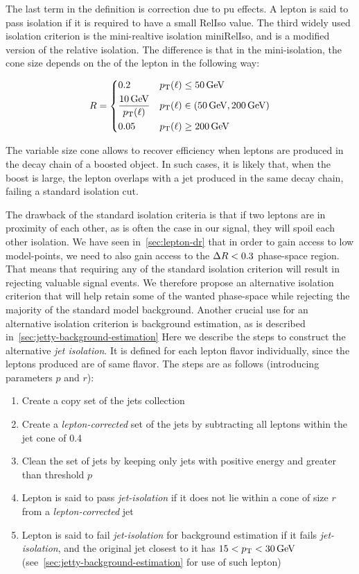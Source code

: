 The last term in the definition is correction due to \gls{pu} effects. A lepton is said to pass isolation if it is required to have a small RelIso value. The third widely used isolation criterion is the mini-realtive isolation miniRelIso, and is a modified version of the relative isolation. The difference is that in the mini-isolation, the cone size depends on the \pt of the lepton in the following way:

\begin{equation}
R = 
\begin{dcases}
0.2 & p_{\mathrm{T}}(\ell)\leq 50\,\text{Ge\hspace{-.08em}V} \\
\frac{10\,\text{Ge\hspace{-.08em}V}}{p_{\mathrm{T}}(\ell)} & p_{\mathrm{T}}(\ell) \in (50\,\text{Ge\hspace{-.08em}V} , 200\,\text{Ge\hspace{-.08em}V}) \\
0.05 & p_{\mathrm{T}}(\ell)\geq 200\,\text{Ge\hspace{-.08em}V}
\end{dcases}
\end{equation}

The variable size cone allows to recover efficiency when leptons are produced in the decay chain of a boosted object. In such cases, it is likely that, when the boost is large, the lepton overlaps with a jet produced in the same decay chain, failing a standard isolation cut. 

The drawback of the standard isolation criteria is that if two leptons are in proximity of each other, as is often the case in our signal, they will spoil each other isolation. We have seen in~\ref{sec:lepton-dr} that in order to gain access to low \dm model-points, we need to also gain access to the $\Delta R<0.3$ phase-space region. That means that requiring any of the standard isolation criterion will result in rejecting valuable signal events. We therefore propose an alternative isolation criterion that will help retain some of the wanted phase-space while rejecting the majority of the standard model background. Another crucial use for an alternative isolation criterion is background estimation, as is described in~\ref{sec:jetty-background-estimation} Here we describe the steps to construct the alternative \emph{jet isolation}. It is defined for each lepton flavor individually, since the leptons produced are of same flavor. The steps are as follows (introducing parameters $p$ and $r$):

\begin{enumerate}
\item Create a copy set of the jets collection
\item Create a \emph{lepton-corrected} set of the jets by subtracting all leptons within the jet cone of 0.4
\item Clean the set of jets by keeping only jets with positive energy and \pt greater than threshold $p$
\item Lepton is said to pass \emph{jet-isolation} if it does not lie within a cone of size $r$ from a \emph{lepton-corrected} jet
\item Lepton is said to fail \emph{jet-isolation} for background estimation if it fails \emph{jet-isolation}, and the original jet closest to it has $15<p_{\mathrm{T}}<30\,\text{Ge\hspace{-.08em}V}$ (see~\ref{sec:jetty-background-estimation} for use of such lepton)
\end{enumerate}

